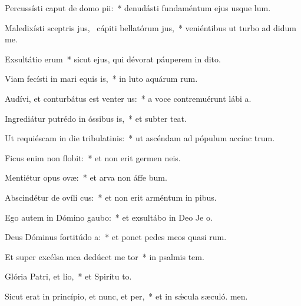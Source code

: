 \item Percussísti caput de domo pii:~* denudásti fundaméntum ejus usque  lum.
\item Maledixísti sceptris jus,~\pscross{} cápiti bellatórum jus,~* veniéntibus ut turbo ad didum me.
\item Exsultátio erum~* sicut ejus, qui dévorat páuperem in dito.
\item Viam fecísti in mari equis is,~* in luto aquárum rum.
\item Audívi, et conturbátus est venter us:~* a voce contremuérunt lábi a.
\item Ingrediátur putrédo in óssibus is,~* et subter  teat.
\item Ut requiéscam in die tribulatinis:~* ut ascéndam ad pópulum accínc trum.
\item Ficus enim non flobit:~* et non erit germen  neis.
\item Mentiétur opus ovæ:~* et arva non áffe bum.
\item Abscindétur de ovíli cus:~* et non erit arméntum in pibus.
\item Ego autem in Dómino gaubo:~* et exsultábo in Deo Je o.
\item Deus Dóminus fortitúdo a:~* et ponet pedes meos quasi rum.
\item Et super excélsa mea dedúcet me tor~* in psalmis tem.
\item Glória Patri, et lio,~* et Spirítu to.
\item Sicut erat in princípio, et nunc, et per,~* et in sǽcula sæculó. men.
